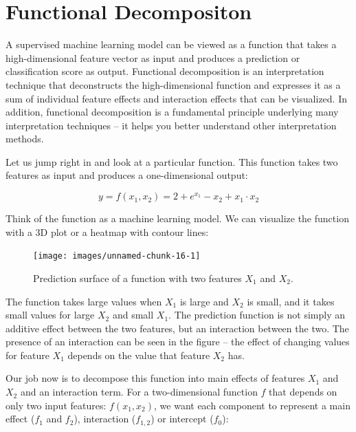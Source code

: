 \documentclass[
  12pt,
]{krantz}
\begin{document}
\hypertarget{decomposition}{%
\section{Functional Decompositon}\label{decomposition}}

A supervised machine learning model can be viewed as a function that takes a high-dimensional feature vector as input and produces a prediction or classification score as output.
Functional decomposition is an interpretation technique that deconstructs the high-dimensional function and expresses it as a sum of individual feature effects and interaction effects that can be visualized.
In addition, functional decomposition is a fundamental principle underlying many interpretation techniques -- it helps you better understand other interpretation methods.

Let us jump right in and look at a particular function.
This function takes two features as input and produces a one-dimensional output:

\[y = f(x_1, x_2) = 2 + e^{x_1} - x_2 + x_1 \cdot x_2\]

Think of the function as a machine learning model.
We can visualize the function with a 3D plot or a heatmap with contour lines:

\begin{figure}

{\centering \texttt{[image: images/unnamed-chunk-16-1]} 

}

\caption{Prediction surface of a function with two features $X_1$ and $X_2$.}\label{fig:unnamed-chunk-16}
\end{figure}

The function takes large values when \(X_1\) is large and \(X_2\) is small, and it takes small values for large \(X_2\) and small \(X_1\).
The prediction function is not simply an additive effect between the two features, but an interaction between the two.
The presence of an interaction can be seen in the figure -- the effect of changing values for feature \(X_1\) depends on the value that feature \(X_2\) has.

Our job now is to decompose this function into main effects of features \(X_1\) and \(X_2\) and an interaction term.
For a two-dimensional function \(f\) that depends on only two input features: \(f(x_1, x_2)\), we want each component to represent a main effect (\(f_1\) and \(f_2\)), interaction (\(f_{1,2}\)) or intercept (\(f_0\)):
\end{document}

